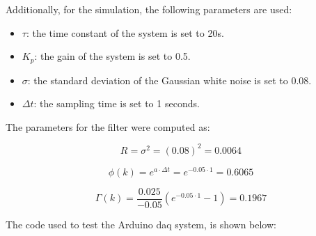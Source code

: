 

Additionally, for the simulation, the following parameters are used:

\begin{itemize}
    \item $\tau$: the time constant of the system is set to 20s.

    \item $K_{p}$: the gain of the system is set to 0.5.

    \item $\sigma$: the standard deviation of the Gaussian white noise is set to 0.08.

    \item $\Delta t$: the sampling time is set to 1 seconds.
\end{itemize}

The parameters for the filter were computed as:

\begin{equation}
    R = \sigma^2 = (0.08)^2 = 0.0064
\end{equation}

\begin{equation}
    \phi(k) = e^{a \cdot \Delta t} = e^{-0.05 \cdot 1} = 0.6065
\end{equation}

\begin{equation}
    \Gamma(k) = \frac{0.025}{-0.05} \left( e^{-0.05 \cdot 1} - 1\right) = 0.1967
\end{equation}

The code used to test the Arduino \acrshort{daq} system, is shown below:




